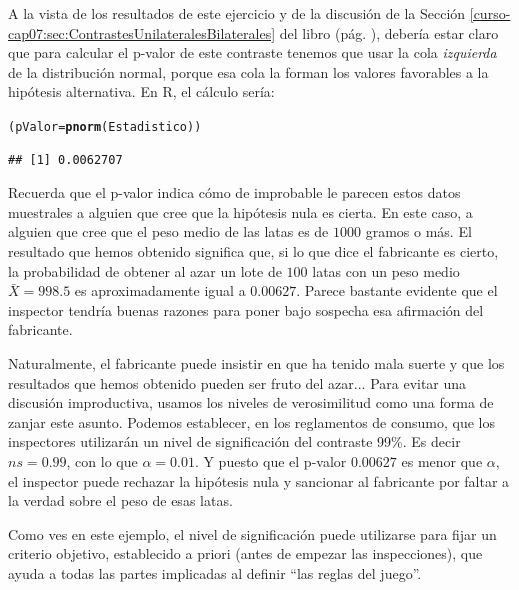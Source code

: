 \documentclass[10pt,a4paper]{article}\usepackage[]{graphicx}\usepackage[]{color}
\makeatletter
\newcommand{\hlstd}[1]{\textcolor[rgb]{0.345,0.345,0.345}{#1}}%
\newcommand{\hlkwb}[1]{\textcolor[rgb]{0.69,0.353,0.396}{#1}}%
\newcommand{\hlkwd}[1]{\textcolor[rgb]{0.737,0.353,0.396}{\textbf{#1}}}%
\newenvironment{kframe}{%
 \def\at@end@of@kframe{}%
 \ifinner\ifhmode%
  \def\at@end@of@kframe{\end{minipage}}%
  \begin{minipage}{\columnwidth}%
 \fi\fi%
 \def\FrameCommand##1{\hskip\@totalleftmargin \hskip-\fboxsep
 \colorbox{shadecolor}{##1}\hskip-\fboxsep
     \hskip-\linewidth \hskip-\@totalleftmargin \hskip\columnwidth}%
 \MakeFramed {\advance\hsize-\width
   \@totalleftmargin\z@ \linewidth\hsize
   \@setminipage}}%
 {\par\unskip\endMakeFramed%
 \at@end@of@kframe}
\newenvironment{knitrout}{}{} %
\newcounter {cont01}
\makeatother
\begin{document}
A la vista de los resultados de este ejercicio y de la discusión de la Sección \ref{curso-cap07:sec:ContrastesUnilateralesBilaterales} del libro (pág. \pageref{curso-cap07:sec:ContrastesUnilateralesBilaterales}), debería estar claro que para calcular el p-valor de este contraste tenemos que usar la cola {\em izquierda} de la distribución normal, porque esa cola la forman los valores favorables a la hipótesis alternativa.
En R, el cálculo sería:
\begin{knitrout}
\color{fgcolor}\begin{kframe}
\begin{alltt}
\hlstd{(pValor} \hlkwb{=} \hlkwd{pnorm}\hlstd{(Estadistico))}
\end{alltt}
\begin{verbatim}
## [1] 0.0062707
\end{verbatim}
\end{kframe}
\end{knitrout}
Recuerda que el p-valor indica cómo de improbable le parecen estos datos muestrales a alguien que cree que la hipótesis nula es cierta. En este caso, a alguien que cree que el peso medio de las latas es de $1000$ gramos o más. El resultado que hemos obtenido significa que, si lo que dice el fabricante es cierto, la probabilidad de obtener al azar un lote de $100$ latas con un peso medio $\bar X = 998.5$ es aproximadamente igual a $0.00627$. Parece bastante evidente que el inspector tendría buenas razones para poner bajo sospecha esa afirmación del fabricante.

Naturalmente, el fabricante puede insistir en que ha tenido mala suerte y que los resultados que hemos obtenido pueden ser fruto del azar... Para evitar una discusión improductiva, usamos los niveles de verosimilitud como una forma de zanjar este asunto. Podemos establecer, en los reglamentos de consumo, que los inspectores utilizarán un nivel de significación del contraste 99\%. Es decir $ns = 0.99$, con lo que $\alpha = 0.01$. Y puesto que el p-valor $0.00627$ es  menor que $\alpha$, el inspector puede rechazar la hipótesis nula y sancionar al fabricante por faltar a la verdad sobre el peso de esas latas.

Como ves en este ejemplo, el nivel de significación puede utilizarse para fijar un criterio objetivo, establecido a priori (antes de empezar las inspecciones), que ayuda a todas las partes implicadas al definir ``las reglas del juego''.
\end{document}
